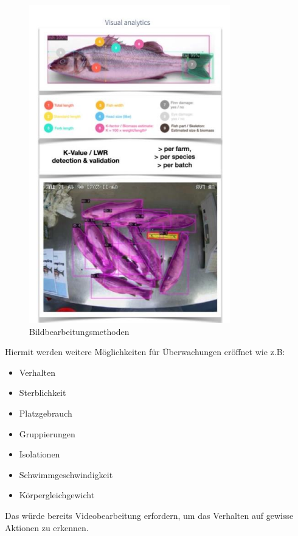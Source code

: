 \documentclass[../main.tex]{subfiles}
\begin{document}
	\begin{figure}[H]
		\centering
		\includegraphics{../images/Imageprocessing} 
		\caption{Bildbearbeitungsmethoden}
		\label{fig:Imageprocessing}
	\end{figure}
	
	\par \noindent
	Hiermit werden weitere Möglichkeiten für Überwachungen eröffnet wie z.B:
	
	\begin{itemize}
		\item Verhalten 
		\item Sterblichkeit
		\item Platzgebrauch
		\item Gruppierungen
		\item Isolationen
		\item Schwimmgeschwindigkeit
		\item Körpergleichgewicht
	\end{itemize}
	\noindent
	Das würde bereits Videobearbeitung erfordern, um das Verhalten auf gewisse Aktionen zu erkennen. 
	
\end{document}
